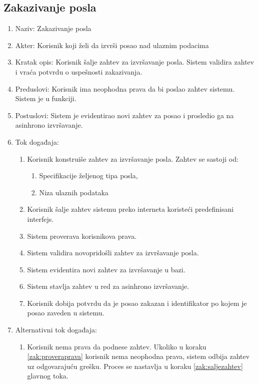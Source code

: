 \documentclass[12pt,oneside]{memoir}
\begin{document}
\subsection{Zakazivanje posla}
\begin{enumerate}
\item Naziv: Zakazivanje posla
\item Akter: Korisnik koji želi da izvrši posao nad ulaznim podacima
\item Kratak opis: Korisnik šalje zahtev za izvršavanje posla. Sistem validira zahtev i vraća potvrdu o uspešnosti zakazivanja.
\item Preduslovi: Korisnik ima neophodna prava da bi poslao zahtev sistemu. Sistem je u funkciji.
\item Postuslovi: Sistem je evidentirao novi zahtev za posao i prosledio ga na asinhrono izvršavanje.
\item Tok događaja:
	\begin{enumerate}
	\item \label{zak:konstruisezahtev}Korisnik konstruiše zahtev za izvršavanje posla. Zahtev se sastoji od:
		\begin{enumerate}
		\item Specifikacije željenog tipa posla,
		\item Niza ulaznih podataka
		\end{enumerate}
	\item \label{zak:saljezahtev} Korisnik šalje zahtev sistemu preko interneta koristeći predefinisani interfejs.
	\item \label{zak:proveraprava} Sistem proverava korisnikova prava.
	\item \label{zak:validacijazahteva} Sistem validira novopridošli zahtev za izvršavanje posla.
	\item Sistem evidentira novi zahtev za izvršavanje u bazi.
	\item \label{zak:asinhzakazivanje} Sistem stavlja zahtev u red za asinhrono izvršavanje.
	\item Korisnik dobija potvrdu da je posao zakazan i identifikator po kojem je posao zaveden u sistemu.
	\end{enumerate}
\item Alternativni tok događaja:
	\begin{enumerate}
	\item Korisnik nema prava da podnese zahtev. Ukoliko u koraku \ref{zak:proveraprava} korisnik nema neophodna prava, sistem odbija zahtev uz odgovarajuću grešku. Proces se nastavlja u koraku \ref{zak:saljezahtev} glavnog toka.

\end{enumerate}
\end{enumerate}
\end{document}
